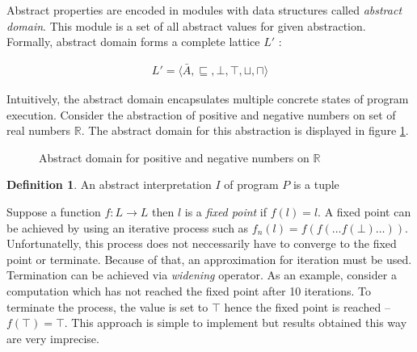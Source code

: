 \documentclass[12pt,final,oneside]{fithesis2}
\theoremstyle{definition}
\newtheorem{definition}{Definition}
\begin{document}
Abstract properties are encoded in modules with data structures called
\textit{abstract domain}. This module is a set of all abstract values
for given abstraction. Formally, abstract domain forms a complete
lattice $L'$ \cite{Constantini11-1}:

\begin{align*}
L' = \langle \bar{A}, \sqsubseteq, \bot, \top, \sqcup, \sqcap  \rangle
\end{align*}

Intuitively, the abstract domain encapsulates multiple concrete states of
program execution. Consider the abstraction of positive and negative
numbers on set of real numbers $\mathbb{R}$. The abstract domain for this
abstraction is displayed in figure \ref{fig:abstractdomain}.

\begin{figure}[ht]
\centering
{}
\caption{Abstract domain for positive and negative numbers on $\mathbb{R}$}
\label{fig:abstractdomain}
\end{figure}

\begin{definition}
An abstract interpretation $I$ of program $P$ is a tuple
\end{definition}

Suppose a function $f: L \to L$ then $l$ is a \textit{fixed point}
if $f(l) = l$. A fixed point can be achieved by using an iterative process
such as $f_n(l) = f(f( \dots f(\bot) \dots ))$. Unfortunatelly, this process
does not neccessarily have to converge to the fixed point or terminate.
Because of that, an approximation for iteration must be used. Termination
can be achieved via \textit{widening} operator. As an example, consider a
computation which has not reached the fixed point after 10 iterations.
To terminate the process, the value is set to $\top$ hence the fixed point
is reached -- $f(\top) = \top$. This approach is simple to implement but
results obtained this way are very imprecise.
\end{document}
